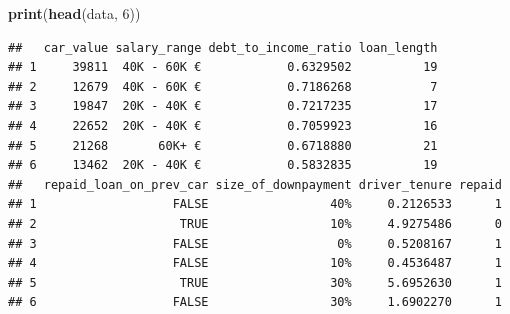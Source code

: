 \documentclass[
]{article}
\newenvironment{Shaded}{\begin{snugshade}}{\end{snugshade}}
\newcommand{\DecValTok}[1]{\textcolor[rgb]{0.00,0.00,0.81}{#1}}
\newcommand{\FunctionTok}[1]{\textcolor[rgb]{0.13,0.29,0.53}{\textbf{#1}}}
\newcommand{\NormalTok}[1]{#1}
\begin{document}
\begin{Shaded}
\begin{Highlighting}[]
\FunctionTok{print}\NormalTok{(}\FunctionTok{head}\NormalTok{(data, }\DecValTok{6}\NormalTok{))}
\end{Highlighting}
\end{Shaded}

\begin{verbatim}
##   car_value salary_range debt_to_income_ratio loan_length
## 1     39811  40K - 60K €            0.6329502          19
## 2     12679  40K - 60K €            0.7186268           7
## 3     19847  20K - 40K €            0.7217235          17
## 4     22652  20K - 40K €            0.7059923          16
## 5     21268       60K+ €            0.6718880          21
## 6     13462  20K - 40K €            0.5832835          19
##   repaid_loan_on_prev_car size_of_downpayment driver_tenure repaid
## 1                   FALSE                 40%     0.2126533      1
## 2                    TRUE                 10%     4.9275486      0
## 3                   FALSE                  0%     0.5208167      1
## 4                   FALSE                 10%     0.4536487      1
## 5                    TRUE                 30%     5.6952630      1
## 6                   FALSE                 30%     1.6902270      1
\end{verbatim}
\end{document}
